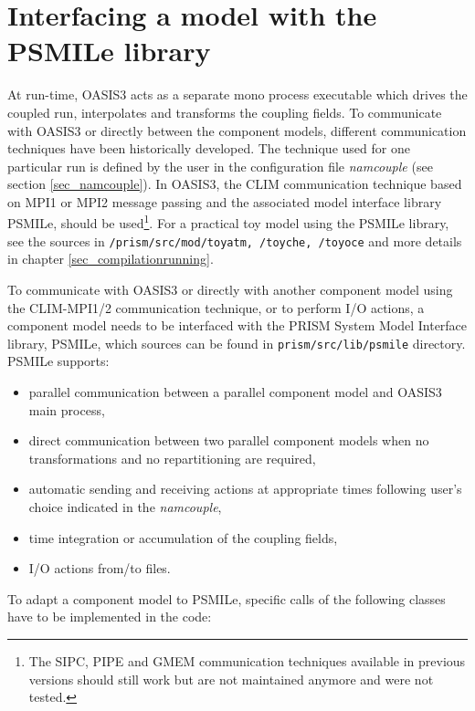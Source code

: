 \newpage
\chapter{Interfacing a model with the PSMILe library}
\label{sec_modelinterfacing}

At run-time, OASIS3 acts as a separate mono process executable which
drives the coupled run, interpolates and transforms the coupling
fields. To communicate with OASIS3 or directly between the component
models, different communication techniques have been historically
developed. The technique used for one particular run is defined by the
user in the configuration file {\it namcouple} (see section
\ref{sec_namcouple}). In OASIS3, the CLIM communication technique
based on MPI1 or MPI2 message passing and the associated model
interface library PSMILe, should be used\footnote{The SIPC, PIPE and
  GMEM communication techniques available in previous versions should
  still work but are not maintained anymore and were not tested.}. For
a practical toy model using the PSMILe library, see the sources in
{\tt /prism/src/mod/toyatm, /toyche, /toyoce} and more details in
chapter \ref{sec_compilationrunning}.



 To communicate with OASIS3 or directly with another component model
 using the CLIM-MPI1/2 communication technique,
  or to perform I/O actions, a component model needs to be interfaced
  with the PRISM System Model Interface library, PSMILe, which sources
  can be found in {\tt prism/src/lib/psmile} directory. PSMILe supports:

\begin{itemize}
\item parallel communication between a parallel component
 model and OASIS3 main process,
\item direct communication between two parallel component models when no
 transformations and no repartitioning are required,
\item automatic sending and receiving actions at appropriate times
 following user's choice indicated in the {\it namcouple},
\item time integration or accumulation of the coupling fields,
\item I/O actions from/to files.
\end{itemize}

 To adapt a component model to PSMILe, specific calls of
 the following classes have to be implemented in the code:

